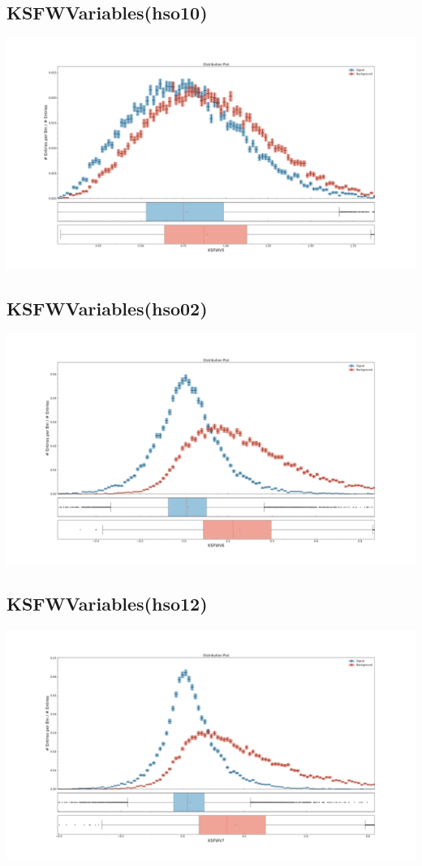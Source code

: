 \documentclass[10pt,a4paper]{article}
\begin{document}
\subsection{KSFWVariables(hso10)}
\begin{center}
\includegraphics[width=1.0\textwidth]{variable_-8906981202890984423.pdf}
\end{center}
\subsection{KSFWVariables(hso02)}
\begin{center}
\includegraphics[width=1.0\textwidth]{variable_-5110443991643032712.pdf}
\end{center}
\subsection{KSFWVariables(hso12)}
\begin{center}
\includegraphics[width=1.0\textwidth]{variable_-5361807685078173071.pdf}
\end{center}
\end{document}
